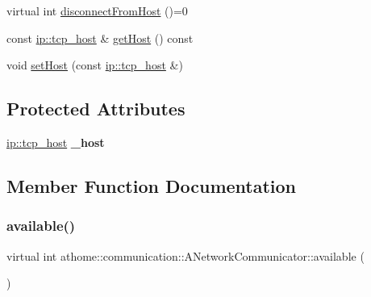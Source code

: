 \begin{DoxyCompactItemize}
\item 
virtual int \mbox{\hyperlink{classathome_1_1communication_1_1_a_network_communicator_a025b7fbe9b3c4452fcf1925d766324eb}{disconnect\+From\+Host}} ()=0
\item 
const \mbox{\hyperlink{structathome_1_1communication_1_1ip_1_1s__host}{ip\+::tcp\+\_\+host}} \& \mbox{\hyperlink{classathome_1_1communication_1_1_a_network_communicator_a6b52a87191bef07e73ec1bbba0713080}{get\+Host}} () const
\item 
void \mbox{\hyperlink{classathome_1_1communication_1_1_a_network_communicator_a2c19d9918fc1d85d1768bfd0ae0bd4d4}{set\+Host}} (const \mbox{\hyperlink{structathome_1_1communication_1_1ip_1_1s__host}{ip\+::tcp\+\_\+host}} \&)
\end{DoxyCompactItemize}
\subsection*{Protected Attributes}
\begin{DoxyCompactItemize}
\item 
\mbox{\label{classathome_1_1communication_1_1_a_network_communicator_ad7b22eedcb47003e1b79e8ec480da119}} 
\mbox{\hyperlink{structathome_1_1communication_1_1ip_1_1s__host}{ip\+::tcp\+\_\+host}} {\bfseries \+\_\+host}
\end{DoxyCompactItemize}


\subsection{Member Function Documentation}
\mbox{\label{classathome_1_1communication_1_1_a_network_communicator_a2bf367d03c98e8523fda71dd43ffa2fb}} 
\subsubsection{\texorpdfstring{available()}{available()}}
{\footnotesize\ttfamily virtual int athome\+::communication\+::\+A\+Network\+Communicator\+::available (\begin{DoxyParamCaption}{ }\end{DoxyParamCaption})\hspace{0.3cm}{\ttfamily [pure virtual]}}

